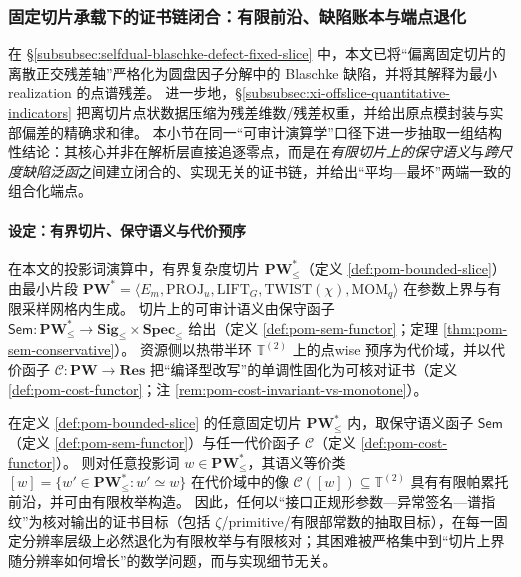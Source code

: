 \subsubsection{固定切片承载下的证书链闭合：有限前沿、缺陷账本与端点退化}\label{subsubsec:xi-fixed-slice-audit-chain}
在 \S\ref{subsubsec:selfdual-blaschke-defect-fixed-slice} 中，本文已将“偏离固定切片的离散正交残差轴”严格化为圆盘因子分解中的 Blaschke 缺陷，并将其解释为最小 realization 的点谱残差。
进一步地，\S\ref{subsubsec:xi-offslice-quantitative-indicators} 把离切片点状数据压缩为残差维数/残差权重，并给出原点模封装与实部偏差的精确求和律。
本小节在同一“可审计演算学”口径下进一步抽取一组结构性结论：其核心并非在解析层直接追逐零点，而是在\emph{有限切片上的保守语义}与\emph{跨尺度缺陷泛函}之间建立闭合的、实现无关的证书链，并给出“平均—最坏”两端一致的组合化端点。

\paragraph{设定：有界切片、保守语义与代价预序}
在本文的投影词演算中，有界复杂度切片 \(\mathbf{PW}^{\ast}_{\le}\)（定义 \ref{def:pom-bounded-slice}）由最小片段
\(
\mathbf{PW}^{\ast}=\langle E_m,\mathrm{PROJ}_u,\mathrm{LIFT}_G,\mathrm{TWIST}(\chi),\mathrm{MOM}_q\rangle
\)
在参数上界与有限采样网格内生成。
切片上的可审计语义由保守函子
\(
\mathsf{Sem}:\mathbf{PW}^{\ast}_{\le}\to \mathbf{Sig}_{\le}\times\mathbf{Spec}_{\le}
\)
给出（定义 \ref{def:pom-sem-functor}；定理 \ref{thm:pom-sem-conservative}）。
资源侧以热带半环 \(\mathbb{T}^{(2)}\) 上的点wise 预序为代价域，并以代价函子 \(\mathcal{C}:\mathbf{PW}\to\mathbf{Res}\) 把“编译型改写”的单调性固化为可核对证书（定义 \ref{def:pom-cost-functor}；注 \ref{rem:pom-cost-invariant-vs-monotone}）。

\begin{theorem}\label{thm:xi-finite-frontier-certificate}
在定义 \ref{def:pom-bounded-slice} 的任意固定切片 \(\mathbf{PW}^{\ast}_{\le}\) 内，取保守语义函子 \(\mathsf{Sem}\)（定义 \ref{def:pom-sem-functor}）与任一代价函子 \(\mathcal{C}\)（定义 \ref{def:pom-cost-functor}）。
则对任意投影词 \(w\in \mathbf{PW}^{\ast}_{\le}\)，其语义等价类
\(
[w]=\{w'\in\mathbf{PW}^{\ast}_{\le}:w'\simeq w\}
\)
在代价域中的像 \(\mathcal{C}([w])\subseteq \mathbb{T}^{(2)}\) 具有有限帕累托前沿，并可由有限枚举构造。
因此，任何以“接口正规形参数—异常签名—谱指纹”为核对输出的证书目标（包括 \(\zeta\)/primitive/有限部常数的抽取目标），在每一固定分辨率层级上必然退化为有限枚举与有限核对；其困难被严格集中到“切片上界随分辨率如何增长”的数学问题，而与实现细节无关。
\end{theorem}

